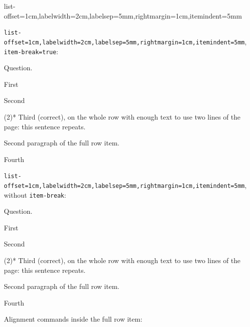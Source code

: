 \documentclass{article}
\begin{document}
  {list-offset=1cm,labelwidth=2cm,labelsep=5mm,rightmargin=1cm,itemindent=5mm}
\newcommand\KEYPAIRK[1]
  {%
    \par\medskip\noindent\texttt{#1}, \texttt{item-break=true}:\par\nobreak
    \begin{enumext}[save-ans=keyx]
      \item Question.
        \begin{keyans*}[columns=2,item-break=true,#1]
          \item First
          \item Second
          \item(2)* Third (correct), on the whole row with enough text to use
            two lines of the page: this sentence repeats.

            Second paragraph of the full row item.
          \item Fourth
        \end{keyans*}
    \end{enumext}
    \par\medskip\noindent\texttt{#1}, without \texttt{item-break}:\par\nobreak
    \begin{enumext}[save-ans=keyy]
      \item Question.
        \begin{keyans*}[columns=2,#1]
          \item First
          \item Second
          \item(2)* Third (correct), on the whole row with enough text to use
            two lines of the page: this sentence repeats.

            Second paragraph of the full row item.
          \item Fourth
        \end{keyans*}
    \end{enumext}
  }
\KEYPAIRK
  {list-offset=1cm,labelwidth=2cm,labelsep=5mm,rightmargin=1cm,itemindent=5mm}

\par\medskip\noindent Alignment commands inside the full row item:
\end{document}
